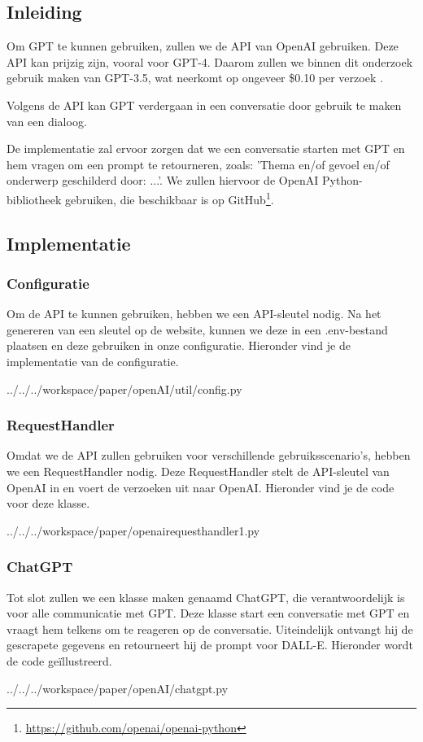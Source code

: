 \subsection{Inleiding}
Om GPT te kunnen gebruiken, zullen we de API van OpenAI gebruiken. Deze API kan prijzig zijn, vooral voor GPT-4. Daarom zullen we binnen dit onderzoek gebruik maken van GPT-3.5, wat neerkomt op ongeveer \$0.10 per verzoek \autocite{gpt_pricing}.

Volgens de API kan GPT verdergaan in een conversatie door gebruik te maken van een dialoog.

De implementatie zal ervoor zorgen dat we een conversatie starten met GPT en hem vragen om een prompt te retourneren, zoals: 'Thema en/of gevoel en/of onderwerp geschilderd door: ...'. We zullen hiervoor de OpenAI Python-bibliotheek gebruiken, die beschikbaar is op GitHub\footnote{\url{https://github.com/openai/openai-python}}.

\subsection{Implementatie}
\subsubsection{Configuratie}
Om de API te kunnen gebruiken, hebben we een API-sleutel nodig. Na het genereren van een sleutel op de website, kunnen we deze in een .env-bestand plaatsen en deze gebruiken in onze configuratie. Hieronder vind je de implementatie van de configuratie.
\begin{pythoncode}{../../../workspace/paper/openAI/util/config.py}
\end{pythoncode}

\subsubsection{RequestHandler}
Omdat we de API zullen gebruiken voor verschillende gebruiksscenario's, hebben we een RequestHandler nodig. Deze RequestHandler stelt de API-sleutel van OpenAI in en voert de verzoeken uit naar OpenAI. Hieronder vind je de code voor deze klasse.
\begin{pythoncode}{../../../workspace/paper/openairequesthandler1.py}
\end{pythoncode}

\subsubsection{ChatGPT}
Tot slot zullen we een klasse maken genaamd ChatGPT, die verantwoordelijk is voor alle communicatie met GPT. Deze klasse start een conversatie met GPT en vraagt hem telkens om te reageren op de conversatie. Uiteindelijk ontvangt hij de gescrapete gegevens en retourneert hij de prompt voor DALL-E. Hieronder wordt de code geïllustreerd.
\begin{pythoncode}{../../../workspace/paper/openAI/chatgpt.py}
\end{pythoncode}

